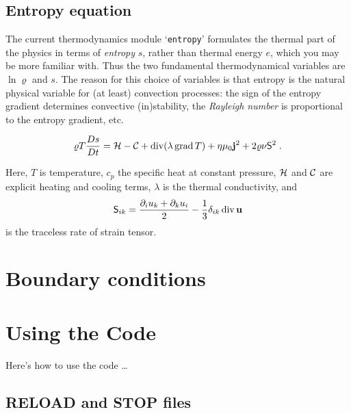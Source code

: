 \documentclass[12pt,twoside,notitlepage,a4paper]{article}
\newcommand{\file}[1]{`\texttt{#1}'}
\newcommand{\grad}    {\mathop{\rm grad}\nolimits}
\newcommand{\Div}     {\mathop{\rm div}\nolimits}
\newcommand{\vekt}[1] {\mathbf{#1}}
\newcommand{\Cool}          {{\cal C}}
\newcommand{\Heat}          {{\cal H}}
\newcommand{\jv}            {\vekt{j}}
\newcommand{\uv}            {\vekt{u}}
\begin{document}
\subsection{Entropy equation}

The current thermodynamics module \file{entropy} formulates the thermal
part of the physics in terms of \emph{entropy} $s$, rather than thermal
energy $e$, which you may be more familiar with.
Thus the two fundamental thermodynamical variables are $\ln\varrho$
and $s$.
The reason for this choice of variables is that entropy is the natural
physical variable for (at least) convection processes: the sign of the
entropy gradient determines convective (in)stability, the
\emph{Rayleigh number} is proportional to the entropy gradient, etc.

\begin{equation}
  \varrho T\frac{Ds}{Dt}
   =  \Heat - \Cool
      + \Div(\lambda\grad T)
      + \eta\mu_0 \jv^2
      + 2\varrho\nu {\sf S}^2 \; .
\end{equation}

Here, $T$ is temperature, $c_p$ the specific heat at constant pressure,
$\Heat$ and $\Cool$ are explicit heating and cooling terms,
$\lambda$ is the thermal conductivity, and
\begin{equation}
  {\sf S}_{ik} = \frac{\partial_i u_k + \partial_k u_i}{2}
                 -\frac{1}{3} \delta_{ik}\Div\uv
\end{equation}
is the traceless rate of strain tensor.

    

\section{Boundary conditions}

    

\section{Using the Code}
\label{Input-params}

Here's how to use the code \ldots

\subsection{RELOAD and STOP files}
\end{document}
